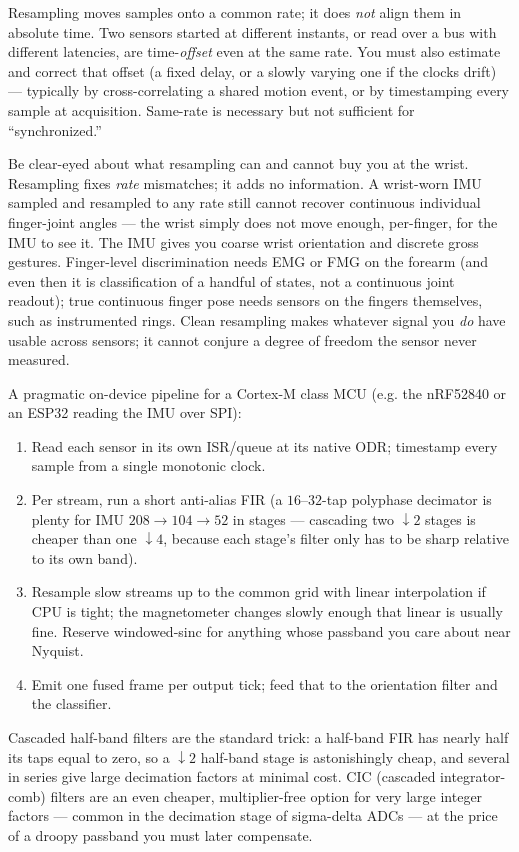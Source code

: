 \begin{trapbox}
Resampling moves samples onto a common rate; it does \emph{not} align them in
absolute time. Two sensors started at different instants, or read over a bus with
different latencies, are time-\emph{offset} even at the same rate. You must also
estimate and correct that offset (a fixed delay, or a slowly varying one if the
clocks drift) --- typically by cross-correlating a shared motion event, or by
timestamping every sample at acquisition. Same-rate is necessary but not
sufficient for ``synchronized.''
\end{trapbox}

\begin{aestheticbox}
Be clear-eyed about what resampling can and cannot buy you at the wrist.
Resampling fixes \emph{rate} mismatches; it adds no information. A wrist-worn IMU sampled and
resampled to any rate still cannot recover continuous individual finger-joint
angles --- the wrist simply does not move enough, per-finger, for the IMU to see
it. The IMU gives you coarse wrist orientation and discrete gross gestures.
Finger-level discrimination needs EMG or FMG on the forearm (and even then it is
classification of a handful of states, not a continuous joint readout); true
continuous finger pose needs sensors on the fingers themselves, such as
instrumented rings. Clean resampling makes whatever signal you \emph{do} have
usable across sensors; it cannot conjure a degree of freedom the sensor never
measured.
\end{aestheticbox}

\begin{buildbox}
A pragmatic on-device pipeline for a Cortex-M class MCU (e.g. the nRF52840 or an
ESP32 reading the IMU over SPI):
\begin{enumerate}
  \item Read each sensor in its own ISR/queue at its native ODR; timestamp every
  sample from a single monotonic clock.
  \item Per stream, run a short anti-alias FIR (a $16$--$32$-tap polyphase
  decimator is plenty for IMU $208\to104\to52$ in stages --- cascading two
  $\downarrow 2$ stages is cheaper than one $\downarrow 4$, because each stage's
  filter only has to be sharp relative to its own band).
  \item Resample slow streams up to the common grid with linear interpolation if
  CPU is tight; the magnetometer changes slowly enough that linear is usually
  fine. Reserve windowed-sinc for anything whose passband you care about near
  Nyquist.
  \item Emit one fused frame per output tick; feed that to the orientation filter
  and the classifier.
\end{enumerate}
Cascaded half-band filters are the standard trick: a half-band FIR has nearly
half its taps equal to zero, so a $\downarrow 2$ half-band stage is astonishingly
cheap, and several in series give large decimation factors at minimal cost. CIC
(cascaded integrator-comb) filters are an even cheaper, multiplier-free option
for very large integer factors --- common in the decimation stage of
sigma-delta ADCs --- at the price of a droopy passband you must later
compensate.
\end{buildbox}

